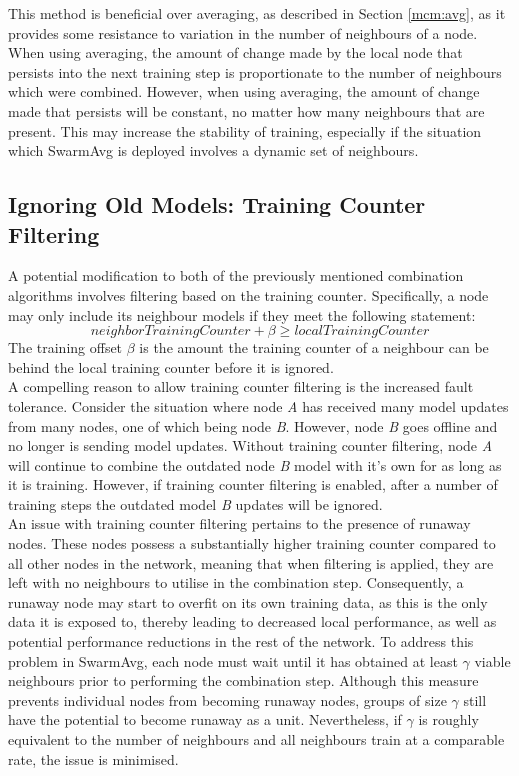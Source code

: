 This method is beneficial over averaging, as described in Section \ref{mcm:avg}, as it provides some resistance to variation in the number of neighbours of a node. When using averaging, the amount of change made by the local node that persists into the next training step is proportionate to the number of neighbours which were combined. However, when using averaging, the amount of change made that persists will be constant, no matter how many neighbours that are present. This may increase the stability of training, especially if the situation which SwarmAvg is deployed involves a dynamic set of neighbours.

\subsection{Ignoring Old Models: Training Counter Filtering}
A potential modification to both of the previously mentioned combination algorithms involves filtering based on the training counter. Specifically, a node may only include its neighbour models if they meet the following statement:
\[neighborTrainingCounter + \beta \ge localTrainingCounter \]
The training offset $\beta$ is the amount the training counter of a neighbour can be behind the local training counter before it is ignored. \\

A compelling reason to allow training counter filtering is the increased fault tolerance. Consider the situation where node \emph{A} has received many model updates from many nodes, one of which being node \emph{B}. However, node \emph{B} goes offline and no longer is sending model updates. Without training counter filtering, node \emph{A} will continue to combine the outdated node \emph{B} model with it's own for as long as it is training. However, if training counter filtering is enabled, after a number of training steps the outdated model \emph{B} updates will be ignored. \\

An issue with training counter filtering pertains to the presence of runaway nodes. These nodes possess a substantially higher training counter compared to all other nodes in the network, meaning that when filtering is applied, they are left with no neighbours to utilise in the combination step. Consequently, a runaway node may start to overfit on its own training data, as this is the only data it is exposed to, thereby leading to decreased local performance, as well as potential performance reductions in the rest of the network. To address this problem in SwarmAvg, each node must wait until it has obtained at least $\gamma$ viable neighbours prior to performing the combination step. Although this measure prevents individual nodes from becoming runaway nodes, groups of size $\gamma$ still have the potential to become runaway as a unit. Nevertheless, if $\gamma$ is roughly equivalent to the number of neighbours and all neighbours train at a comparable rate, the issue is minimised.

